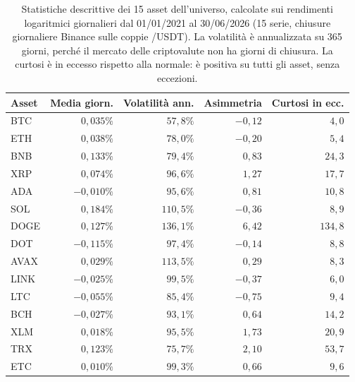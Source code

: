 \begin{table}[H]
\centering
\caption[Statistiche descrittive dell'universo]{Statistiche descrittive dei 15 asset dell'universo, calcolate sui rendimenti logaritmici giornalieri dal 01/01/2021 al 30/06/2026 (15 serie, chiusure giornaliere Binance sulle coppie /USDT). La volatilità è annualizzata su 365 giorni, perché il mercato delle criptovalute non ha giorni di chiusura. La curtosi è in eccesso rispetto alla normale: è positiva su tutti gli asset, senza eccezioni.}
\label{tab:universe}
\begin{tabular}{@{}lrrrr@{}}
\toprule
\textbf{Asset} & \textbf{Media giorn.} & \textbf{Volatilità ann.} & \textbf{Asimmetria} & \textbf{Curtosi in ecc.} \\
\midrule
BTC & $0{,}035\%$ & $57{,}8\%$ & $-0{,}12$ & $4{,}0$ \\
ETH & $0{,}038\%$ & $78{,}0\%$ & $-0{,}20$ & $5{,}4$ \\
BNB & $0{,}133\%$ & $79{,}4\%$ & $0{,}83$ & $24{,}3$ \\
XRP & $0{,}074\%$ & $96{,}6\%$ & $1{,}27$ & $17{,}7$ \\
ADA & $-0{,}010\%$ & $95{,}6\%$ & $0{,}81$ & $10{,}8$ \\
SOL & $0{,}184\%$ & $110{,}5\%$ & $-0{,}36$ & $8{,}9$ \\
DOGE & $0{,}127\%$ & $136{,}1\%$ & $6{,}42$ & $134{,}8$ \\
DOT & $-0{,}115\%$ & $97{,}4\%$ & $-0{,}14$ & $8{,}8$ \\
AVAX & $0{,}029\%$ & $113{,}5\%$ & $0{,}29$ & $8{,}3$ \\
LINK & $-0{,}025\%$ & $99{,}5\%$ & $-0{,}37$ & $6{,}0$ \\
LTC & $-0{,}055\%$ & $85{,}4\%$ & $-0{,}75$ & $9{,}4$ \\
BCH & $-0{,}027\%$ & $93{,}1\%$ & $0{,}64$ & $14{,}2$ \\
XLM & $0{,}018\%$ & $95{,}5\%$ & $1{,}73$ & $20{,}9$ \\
TRX & $0{,}123\%$ & $75{,}7\%$ & $2{,}10$ & $53{,}7$ \\
ETC & $0{,}010\%$ & $99{,}3\%$ & $0{,}66$ & $9{,}6$ \\
\bottomrule
\end{tabular}
\end{table}
